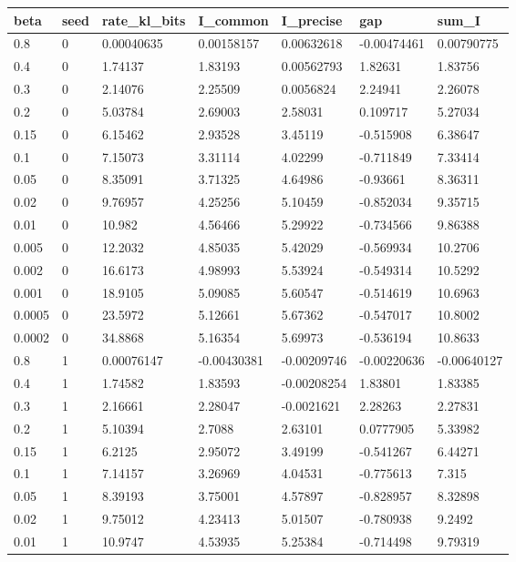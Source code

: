 \begin{tabular}{lllllll}
\toprule
beta & seed & rate\_kl\_bits & I\_common & I\_precise & gap & sum\_I \\
\midrule
0.8 & 0 & 0.00040635 & 0.00158157 & 0.00632618 & -0.00474461 & 0.00790775 \\
0.4 & 0 & 1.74137 & 1.83193 & 0.00562793 & 1.82631 & 1.83756 \\
0.3 & 0 & 2.14076 & 2.25509 & 0.0056824 & 2.24941 & 2.26078 \\
0.2 & 0 & 5.03784 & 2.69003 & 2.58031 & 0.109717 & 5.27034 \\
0.15 & 0 & 6.15462 & 2.93528 & 3.45119 & -0.515908 & 6.38647 \\
0.1 & 0 & 7.15073 & 3.31114 & 4.02299 & -0.711849 & 7.33414 \\
0.05 & 0 & 8.35091 & 3.71325 & 4.64986 & -0.93661 & 8.36311 \\
0.02 & 0 & 9.76957 & 4.25256 & 5.10459 & -0.852034 & 9.35715 \\
0.01 & 0 & 10.982 & 4.56466 & 5.29922 & -0.734566 & 9.86388 \\
0.005 & 0 & 12.2032 & 4.85035 & 5.42029 & -0.569934 & 10.2706 \\
0.002 & 0 & 16.6173 & 4.98993 & 5.53924 & -0.549314 & 10.5292 \\
0.001 & 0 & 18.9105 & 5.09085 & 5.60547 & -0.514619 & 10.6963 \\
0.0005 & 0 & 23.5972 & 5.12661 & 5.67362 & -0.547017 & 10.8002 \\
0.0002 & 0 & 34.8868 & 5.16354 & 5.69973 & -0.536194 & 10.8633 \\
0.8 & 1 & 0.00076147 & -0.00430381 & -0.00209746 & -0.00220636 & -0.00640127 \\
0.4 & 1 & 1.74582 & 1.83593 & -0.00208254 & 1.83801 & 1.83385 \\
0.3 & 1 & 2.16661 & 2.28047 & -0.0021621 & 2.28263 & 2.27831 \\
0.2 & 1 & 5.10394 & 2.7088 & 2.63101 & 0.0777905 & 5.33982 \\
0.15 & 1 & 6.2125 & 2.95072 & 3.49199 & -0.541267 & 6.44271 \\
0.1 & 1 & 7.14157 & 3.26969 & 4.04531 & -0.775613 & 7.315 \\
0.05 & 1 & 8.39193 & 3.75001 & 4.57897 & -0.828957 & 8.32898 \\
0.02 & 1 & 9.75012 & 4.23413 & 5.01507 & -0.780938 & 9.2492 \\
0.01 & 1 & 10.9747 & 4.53935 & 5.25384 & -0.714498 & 9.79319 \\

\end{tabular}
